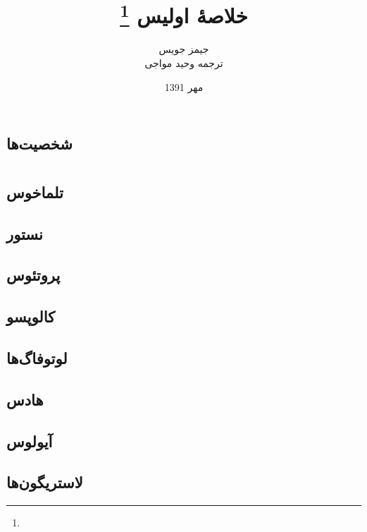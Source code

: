 \documentclass[12pt,onecolumn,a4paper]{book}
\begin{document}
    \title{خلاصۀ اولیس \footnote{}}
    \author{جیمز جویس\\
    ترجمه وحید مواجی
    }
    \date{مهر 1391}
    \frontmatter                            %
    \maketitle                              %
    \tableofcontents                        %
    \mainmatter

    \part{}
    \chapter{شخصیت‌ها}

    \part{}
    \chapter{تلماخوس}
    \chapter{نستور}
    \chapter{پروتئوس}
    \chapter{کالوپسو}
    \chapter{لوتوفاگ‌ها}
    \chapter{هادس}
    \chapter{آیولوس}
    \chapter{لاستریگون‌ها}
\end{document}

